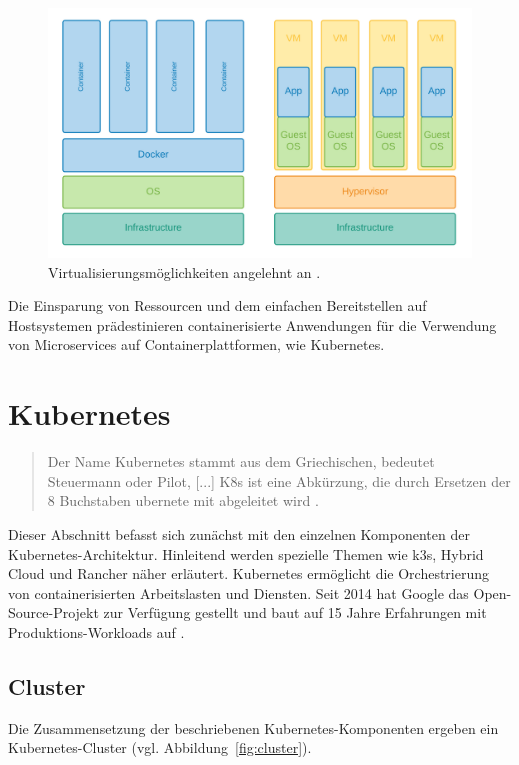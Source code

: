 \begin{figure}
    \centering
    \includegraphics[width=1.0\columnwidth]{images/Container-VM.png}
    \caption{Virtualisierungsmöglichkeiten angelehnt an \protect\cite{containervsvm}.}
    \label{fig:containervm}
\end{figure}

Die Einsparung von Ressourcen und dem einfachen Bereitstellen auf Hostsystemen
prädestinieren containerisierte Anwendungen für die Verwendung von Microservices
auf Containerplattformen, wie Kubernetes.


\section{Kubernetes}
\begin{quote}
  \glqq Der Name Kubernetes stammt aus dem Griechischen, bedeutet Steuermann oder Pilot, [...]
K8s ist eine Abkürzung, die durch Ersetzen der 8 Buchstaben \dq ubernete\dq{} mit \dq{} abgeleitet wird\grqq{} \cite{kubernetes}.
\end{quote}


Dieser Abschnitt befasst sich zunächst mit den einzelnen Komponenten der Kubernetes-Architektur.
Hinleitend werden spezielle Themen wie k3s, Hybrid Cloud und Rancher näher erläutert.
Kubernetes ermöglicht die Orchestrierung von containerisierten Arbeitslasten
und Diensten. Seit 2014 hat Google das Open-Source-Projekt zur Verfügung
gestellt und baut auf 15 Jahre Erfahrungen mit Produktions-Workloads auf \cite{kubernetes}.

\subsection{Cluster}
Die Zusammensetzung der beschriebenen Kubernetes-Komponenten ergeben ein Kubernetes-Cluster (vgl. Abbildung~\ref{fig:cluster}).


